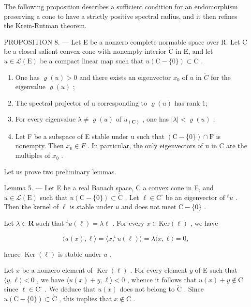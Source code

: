 The following proposition describes a sufficient condition for an endomorphism preserving a cone to have a strictly positive spectral radius, and it then refines the Krein-Rutman theorem.

PROPOSITION 8. --- Let E be a nonzero complete normable space over R. Let C be a closed salient convex cone with nonempty interior \(\mathring{\mathrm{C}}\) in E, and let \(u \in \mathcal{L}(\mathrm{E})\) be a compact linear map such that \(u(\mathrm{C} - \{0\}) \subset \mathring{\mathrm{C}}\) .

\begin{enumerate}
\def\labelenumi{\alph{enumi})}
\item
  One has \(\varrho(u) > 0\) and there exists an eigenvector \(x_0\) of \(u\) in \(\mathring{C}\) for the eigenvalue \(\varrho(u)\) ;
\item
  The spectral projector of u corresponding to \(\varrho(u)\) has rank 1;
\item
  For every eigenvalue \(\lambda \neq \varrho(u)\) of \(u_{(\mathbf{C})}\) , one has \(|\lambda| < \varrho(u)\) ;
\item
  Let F be a subspace of E stable under u such that \((\mathrm{C}-\{0\})\cap\mathrm{F}\) is nonempty. Then \(x_{0}\in F\) . In particular, the only eigenvectors of u in C are the multiples of \(x_{0}\) .
\end{enumerate}

Let us prove two preliminary lemmas.

Lemma 5. --- Let E be a real Banach space, C a convex cone in E, and \(u \in \mathcal{L}(\mathrm{E})\) such that \(u(\mathrm{C} - \{0\}) \subset \mathring{\mathrm{C}}\) . Let \(\ell \in \mathrm{C}^{\circ}\) be an eigenvector of \(^{t}u\) . Then the kernel of \(\ell\) is stable under \(u\) and does not meet \(\mathrm{C} - \{0\}\) .

Let \(\lambda \in \mathbf{R}\) such that \(^t u(\ell) = \lambda \ell\) . For every \(x \in \mathrm{Ker}(\ell)\) , we have

\[
\langle u (x), \ell \rangle = \langle x, ^ {t} u (\ell) \rangle = \lambda \langle x, \ell \rangle = 0,
\]

hence \(\operatorname{Ker}(\ell)\) is stable under \(u\) .

Let \(x\) be a nonzero element of \(\operatorname{Ker}(\ell)\) . For every element \(y\) of E such that \(\langle y, \ell \rangle < 0\) , we have \(\langle u(x) + y, \ell \rangle < 0\) , whence it follows that \(u(x) + y \notin \mathrm{C}\) since \(\ell \in \mathrm{C}^\circ\) . We deduce that \(u(x)\) does not belong to \(\mathring{\mathrm{C}}\) . Since \(u(\mathrm{C} - \{0\}) \subset \mathring{\mathrm{C}}\) , this implies that \(x \notin \mathrm{C}\) .

